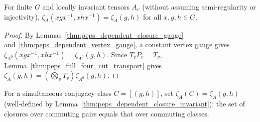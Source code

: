 \begin{lemma}%
    \label{thm:peps_dependent_closure_invariant}
    \leanok
    For finite $G$ and locally invariant tensors $A_v$ (without assuming
    semi-regularity or injectivity),
    $\zeta_A(xgx^{-1},xhx^{-1})=\zeta_A(g,h)$ for all $x,g,h\in G$.
\end{lemma}
\begin{proof}\leanok
    By Lemmas~\ref{thm:peps_dependent_closure_gauge}
    and~\ref{thm:peps_dependent_vertex_gauge}, a constant vertex gauge
    gives $\zeta_{A^0}(xgx^{-1},xhx^{-1})=\zeta_{A^0}(g,h)$. Since
    $T_vP_v=T_v$, Lemma~\ref{thm:peps_full_four_cut_transport} gives
    $\zeta_A(g,h)=(\bigotimes_vT_v)\zeta_{A^0}(g,h)$.
\end{proof}

\begin{definition}%
    \label{def:peps_dependent_closure_class}
    \leanok
    For a simultaneous conjugacy class $C=[(g,h)]$, set
    $\zeta_A(C)=\zeta_A(g,h)$ (well-defined by
    Lemma~\ref{thm:peps_dependent_closure_invariant}); the set of
    closures over commuting pairs equals that over commuting classes.
\end{definition}

